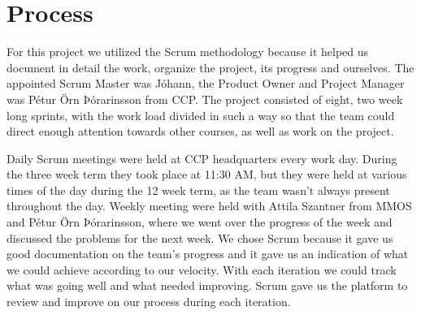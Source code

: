 \section{Process}\label{sec:process}
For this project we utilized the Scrum methodology because it helped us document in detail the work, organize the project, its progress and ourselves. The appointed Scrum Master was Jóhann, the Product Owner and Project Manager was Pétur Örn Þórarinsson from CCP. The project consisted of eight, two week long sprints, with the work load divided in such a way so that the team could direct enough attention towards other courses, as well as work on the project.

Daily Scrum meetings were held at CCP headquarters every work day. During the three week term they took place at 11:30 AM, but they were held at various times of the day during the 12 week term, as the team wasn't always present throughout the day. Weekly meeting were held with Attila Szantner from MMOS and Pétur Örn Þórarinsson, where we went over the progress of the week and discussed the problems for the next week. We chose Scrum because it gave us good documentation on the team's progress and it gave us an indication of what we could achieve according to our velocity. With each iteration we could track what was going well and what needed improving. Scrum gave us the platform to review and improve on our process during each iteration. 
